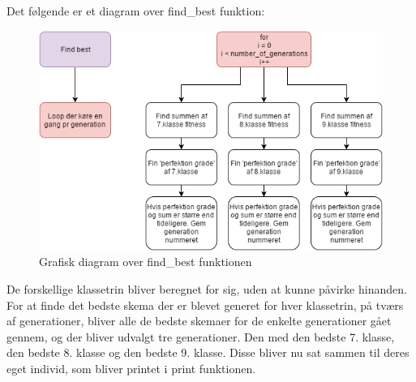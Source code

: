 Det følgende er et diagram over find_best funktion:
\begin{figure}[!h]
\includegraphics[width=\textwidth]{partials/graphics/bestof.png}
\caption{Grafisk diagram over find_best funktionen}
\label{fig:diagrambestof}
\end{figure}

De forskellige klassetrin bliver beregnet for sig, uden at kunne påvirke hinanden. For at finde det bedste skema der er blevet generet for hver klassetrin, på tværs af generationer, bliver alle de bedste skemaer for de enkelte generationer gået gennem, og der bliver udvalgt tre generationer. Den med den bedste 7. klasse, den bedste 8. klasse og den bedste 9. klasse. Disse bliver nu sat sammen til deres eget individ, som bliver printet i print funktionen. 

